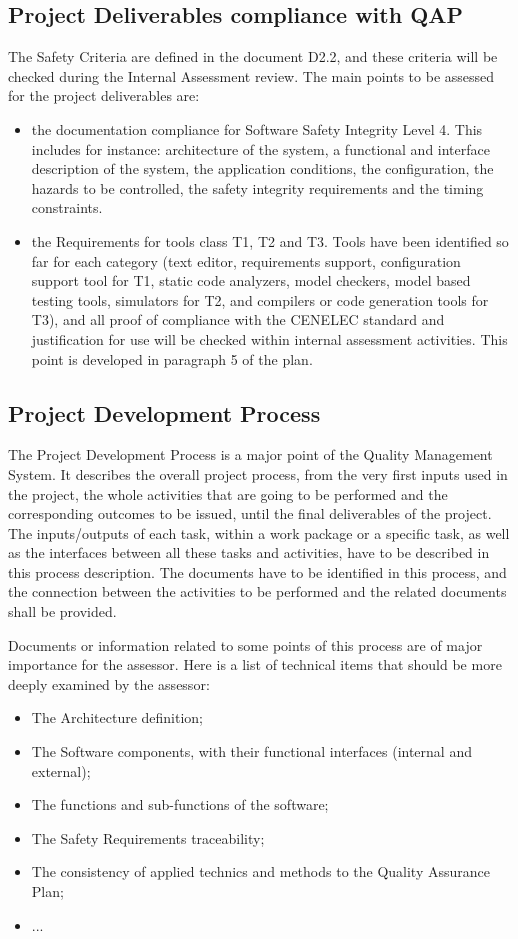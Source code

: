 \documentclass{template/openetcs_article}
\begin{document}
\subsection{Project Deliverables compliance with QAP}
The Safety Criteria are defined in the document D2.2, and these criteria will be checked during the Internal Assessment review. The main points to be assessed
for the project deliverables are:
\begin{itemize}
\item the documentation compliance for Software Safety Integrity Level 4. This includes for instance: architecture of the system, a functional and interface description of the system, the
application conditions, the configuration, the hazards to be controlled, the safety integrity requirements and the timing constraints.
\item the Requirements for tools class T1, T2 and T3. Tools have been identified so far for each category (text editor, requirements support, configuration
support tool for T1, static code analyzers, model checkers, model based testing tools, simulators for T2, and compilers or code generation tools for T3), and
all proof of compliance with the CENELEC standard and justification for use will be checked within internal assessment activities. This point is developed in
paragraph 5 of the plan.
\end{itemize}

\subsection{Project Development Process}
The Project Development Process is a major point of the Quality Management System. It describes the overall project process, from the very first inputs used in
the project, the whole activities that are going to be performed and the corresponding outcomes to be issued, until the final deliverables of the project. The
inputs/outputs of each task, within a work package or a specific task, as well as the interfaces between all these tasks and activities, have to be described in
this process description.
The documents have to be identified in this process, and the connection  between the activities to be performed and the related documents shall be provided.

Documents or information related to some points of this process are of major importance for the assessor. Here is a list of technical items that should be more
deeply examined by the assessor:
\begin{itemize}
\item The Architecture definition;
\item The Software components, with their functional interfaces (internal and external);
\item The functions and sub-functions of the software;
\item The Safety Requirements traceability;
\item The consistency of applied technics and methods to the Quality Assurance Plan;
\item ...
\end{itemize}
\end{document}
